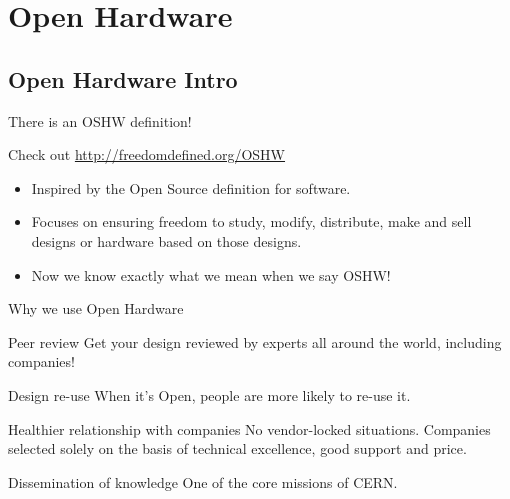 \documentclass[compress,red]{beamer}
\begin{document}

\section{Open Hardware}


\subsection{Open Hardware Intro}

\begin{frame}{There is an OSHW definition!}

\begin{block}{Check out \href{http://freedomdefined.org/OSHW}{http://freedomdefined.org/OSHW}}
\begin{itemize}
 \item Inspired by the Open Source definition for software.
 \item Focuses on ensuring freedom to study, modify, distribute, make
   and sell designs or hardware based on those designs.
 \item Now we know exactly what we mean when we say OSHW!
\end{itemize}
\end{block}
\end{frame}

\begin{frame}{Why we use Open Hardware}

	\begin{block}{Peer review}
	 Get your design reviewed by experts all around the world, including companies!
	\end{block}

\begin{block}{Design re-use}
  When it's Open, people are more likely to re-use it.
	\end{block}
	\begin{block}{Healthier relationship with companies}
          No vendor-locked situations. Companies selected solely on the basis of technical excellence, good support and price.
	\end{block}
	\begin{block}{Dissemination of knowledge}
          One of the core missions of CERN.
	\end{block}
\end{frame}
\end{document}

